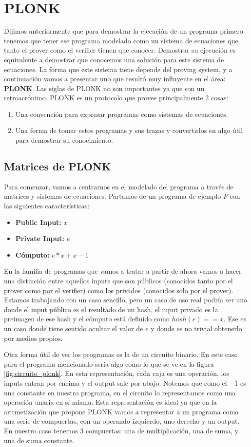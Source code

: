 \section{PLONK}\label{sec:plonk}
Dijimos anteriormente que para demostrar la ejecución de un programa primero tenemos que tener ese programa modelado como un sistema de ecuaciones que tanto el prover como el verifier tienen que conocer. Demostrar su ejecución es equivalente a demostrar que conocemos una solución para este sistema de ecuaciones. La forma que este sistema tiene depende del proving system, y a continuación vamos a presentar uno que resultó muy influyente en el área: \textbf{PLONK}\cite{PLONK}. Las siglas de PLONK no son importantes ya que son un retroacrónimo. PLONK es un protocolo que provee principalmente 2 cosas:
\begin{enumerate}
    \item Una convención para expresar programas como sistemas de ecuaciones.
    \item Una forma de tomar estos programas y sus trazas y convertirlos en algo útil para demostrar su conocimiento. 
\end{enumerate}

\subsection{Matrices de PLONK}
Para comenzar, vamos a centrarnos en el modelado del programa a través de matrices y sistemas de ecuaciones. Partamos de un programa de ejemplo $P$ con las siguientes características:
\begin{itemize}
    \item \textbf{Public Input:} $x$
    \item \textbf{Private Input:} $e$
    \item \textbf{Cómputo:} $e*x + x - 1$
\end{itemize}
En la familia de programas que vamos a tratar a partir de ahora vamos a hacer una distinción entre aquellos inputs que son públicos (conocidos tanto por el prover como por el verifier) como los privados (conocidos solo por el prover). Estamos trabajando con un caso sencillo, pero un caso de uso real podría ser uno donde el input público es el resultado de un hash, el input privado es la preimagen de ese hash y el cómputo está definido como $hash(e) == x$. Ese es un caso donde tiene sentido ocultar el valor de $e$ y donde es no trivial obtenerlo por medios propios.

Otra forma útil de ver los programas es la de un circuito binario. En este caso para el programa mencionado sería algo como lo que se ve en la figura \ref{fig:circuito_plonk}. En esta representación, cada caja es una operación, los inputs entran por encima y el output sale por abajo. Notemos que como el $-1$ es una constante en nuestro programa, en el circuito lo representamos como una operación unaria en sí misma. Esta representación es ideal ya que en la aritmetización que propone PLONK vamos a representar a un programa como una serie de compuertas, con un operando izquierdo, uno derecho y un output. En nuestro caso tenemos 3 compuertas: una de multiplicación, una de suma, y una de suma constante. 

